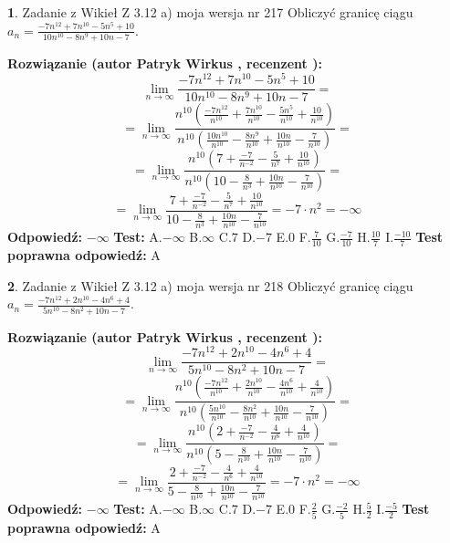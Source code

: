 \documentclass[12pt, a4paper]{article}
\theoremstyle{definition} %
\newtheorem{zad}{}
\newcommand{\zadStart}[1]{\begin{zad}#1\newline}
\newcommand{\zadStop}{\end{zad}}
\newcommand{\rozwStart}[2]{\noindent \textbf{Rozwiązanie (autor #1 , recenzent #2): }\newline}
\newcommand{\rozwStop}{\newline}
\newcommand{\odpStart}{\noindent \textbf{Odpowiedź:}\newline}
\newcommand{\odpStop}{\newline}
\newcommand{\testStart}{\noindent \textbf{Test:}\newline}
\newcommand{\testStop}{\newline}
\newcommand{\kluczStart}{\noindent \textbf{Test poprawna odpowiedź:}\newline}
\newcommand{\kluczStop}{\newline}
\begin{document}
\zadStart{Zadanie z Wikieł Z 3.12 a) moja wersja nr 217}
Obliczyć granicę ciągu $a_{n}=\frac{-7n^{12}+7n^{10}-5n^{5}+10}{10n^{10}-8n^{9}+10n-7}$.
\zadStop
\rozwStart{Patryk Wirkus}{}
$$\lim\limits_{n\to\infty}\frac{-7n^{12}+7n^{10}-5n^{5}+10}{10n^{10}-8n^{9}+10n-7}=$$
$$=\lim\limits_{n\to\infty}\frac{n^{10}\left(\frac{-7n^{12}}{n^{10}}+\frac{7n^{10}}{n^{10}}-\frac{5n^{5}}{n^{10}}+\frac{10}{n^{10}}\right)}{n^{10}\left(\frac{10n^{10}}{n^{10}}-\frac{8n^{9}}{n^{10}}+\frac{10n}{n^{10}}-\frac{7}{n^{10}}\right)}=$$
$$=\lim\limits_{n\to\infty}\frac{n^{10}\left(7+\frac{-7}{n^{-2}}-\frac{5}{n^{7}}+\frac{10}{n^{10}}\right)}
{n^{10}\left(10-\frac{8}{n^{3}}+\frac{10n}{n^{10}}-\frac{7}{n^{10}}\right)}=$$
$$=\lim\limits_{n\to\infty}\frac{7+\frac{-7}{n^{-2}}-\frac{5}{n^{7}}+\frac{10}{n^{10}}}{10-\frac{8}{n^{3}}+\frac{10n}{n^{10}}-\frac{7}{n^{10}}}=-7\cdot n^{2} = -\infty$$
\rozwStop
\odpStart
$-\infty$
\odpStop
\testStart
A.$-\infty$
B.$\infty$
C.$7$
D.$-7$
E.$0$
F.$\frac{7}{10}$
G.$\frac{-7}{10}$
H.$\frac{10}{7}$
I.$\frac{-10}{7}$
\testStop
\kluczStart
A
\kluczStop



\zadStart{Zadanie z Wikieł Z 3.12 a) moja wersja nr 218}
Obliczyć granicę ciągu $a_{n}=\frac{-7n^{12}+2n^{10}-4n^{6}+4}{5n^{10}-8n^{2}+10n-7}$.
\zadStop
\rozwStart{Patryk Wirkus}{}
$$\lim\limits_{n\to\infty}\frac{-7n^{12}+2n^{10}-4n^{6}+4}{5n^{10}-8n^{2}+10n-7}=$$
$$=\lim\limits_{n\to\infty}\frac{n^{10}\left(\frac{-7n^{12}}{n^{10}}+\frac{2n^{10}}{n^{10}}-\frac{4n^{6}}{n^{10}}+\frac{4}{n^{10}}\right)}{n^{10}\left(\frac{5n^{10}}{n^{10}}-\frac{8n^{2}}{n^{10}}+\frac{10n}{n^{10}}-\frac{7}{n^{10}}\right)}=$$
$$=\lim\limits_{n\to\infty}\frac{n^{10}\left(2+\frac{-7}{n^{-2}}-\frac{4}{n^{6}}+\frac{4}{n^{10}}\right)}
{n^{10}\left(5-\frac{8}{n^{10}}+\frac{10n}{n^{10}}-\frac{7}{n^{10}}\right)}=$$
$$=\lim\limits_{n\to\infty}\frac{2+\frac{-7}{n^{-2}}-\frac{4}{n^{6}}+\frac{4}{n^{10}}}{5-\frac{8}{n^{10}}+\frac{10n}{n^{10}}-\frac{7}{n^{10}}}=-7\cdot n^{2} = -\infty$$
\rozwStop
\odpStart
$-\infty$
\odpStop
\testStart
A.$-\infty$
B.$\infty$
C.$7$
D.$-7$
E.$0$
F.$\frac{2}{5}$
G.$\frac{-2}{5}$
H.$\frac{5}{2}$
I.$\frac{-5}{2}$
\testStop
\kluczStart
A
\kluczStop
\end{document}
